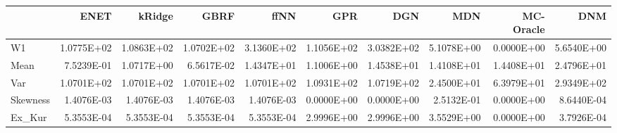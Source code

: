\begin{tabular}{lrrrrrrrrr}
\toprule
{} &       ENET &     kRidge &       GBRF &       ffNN &        GPR &        DGN &        MDN &  MC-Oracle &        DNM \\
\midrule
W1       & 1.0775E+02 & 1.0863E+02 & 1.0702E+02 & 3.1360E+02 & 1.1056E+02 & 3.0382E+02 & 5.1078E+00 & 0.0000E+00 & 5.6540E+00 \\
Mean     & 7.5239E-01 & 1.0717E+00 & 6.5617E-02 & 1.4347E+01 & 1.1006E+00 & 1.4538E+01 & 1.4108E+01 & 1.4408E+01 & 2.4796E+01 \\
Var      & 1.0701E+02 & 1.0701E+02 & 1.0701E+02 & 1.0701E+02 & 1.0931E+02 & 1.0719E+02 & 2.4500E+01 & 6.3979E+01 & 2.9349E+02 \\
Skewness & 1.4076E-03 & 1.4076E-03 & 1.4076E-03 & 1.4076E-03 & 0.0000E+00 & 0.0000E+00 & 2.5132E-01 & 0.0000E+00 & 8.6440E-04 \\
Ex\_Kur   & 5.3553E-04 & 5.3553E-04 & 5.3553E-04 & 5.3553E-04 & 2.9996E+00 & 2.9996E+00 & 3.5529E+00 & 0.0000E+00 & 3.7926E-04 \\
\bottomrule
\end{tabular}
